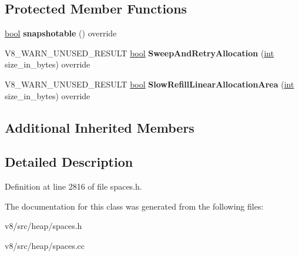 \subsection*{Protected Member Functions}
\begin{DoxyCompactItemize}
\item 
\mbox{\label{classv8_1_1internal_1_1CompactionSpace_a2dab61a279898a30419bd2d8b709ce77}} 
\mbox{\hyperlink{classbool}{bool}} {\bfseries snapshotable} () override
\item 
\mbox{\label{classv8_1_1internal_1_1CompactionSpace_a61265cfe96cbe27904cb3c932073eef9}} 
V8\+\_\+\+W\+A\+R\+N\+\_\+\+U\+N\+U\+S\+E\+D\+\_\+\+R\+E\+S\+U\+LT \mbox{\hyperlink{classbool}{bool}} {\bfseries Sweep\+And\+Retry\+Allocation} (\mbox{\hyperlink{classint}{int}} size\+\_\+in\+\_\+bytes) override
\item 
\mbox{\label{classv8_1_1internal_1_1CompactionSpace_a3387eba98a259864b44be06a36c43ba9}} 
V8\+\_\+\+W\+A\+R\+N\+\_\+\+U\+N\+U\+S\+E\+D\+\_\+\+R\+E\+S\+U\+LT \mbox{\hyperlink{classbool}{bool}} {\bfseries Slow\+Refill\+Linear\+Allocation\+Area} (\mbox{\hyperlink{classint}{int}} size\+\_\+in\+\_\+bytes) override
\end{DoxyCompactItemize}
\subsection*{Additional Inherited Members}


\subsection{Detailed Description}


Definition at line 2816 of file spaces.\+h.



The documentation for this class was generated from the following files\+:\begin{DoxyCompactItemize}
\item 
v8/src/heap/spaces.\+h\item 
v8/src/heap/spaces.\+cc\end{DoxyCompactItemize}
